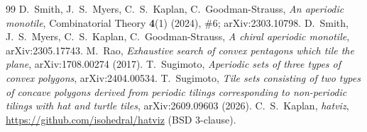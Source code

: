 \documentclass[11pt]{article}
\theoremstyle{remark}
\begin{document}
\begin{thebibliography}{99}
 D.~Smith, J.~S.~Myers, C.~S.~Kaplan, C.~Goodman-Strauss, \emph{An aperiodic monotile}, Combinatorial Theory \textbf{4}(1) (2024), \#6; arXiv:2303.10798.
 D.~Smith, J.~S.~Myers, C.~S.~Kaplan, C.~Goodman-Strauss, \emph{A chiral aperiodic monotile}, arXiv:2305.17743.
 M.~Rao, \emph{Exhaustive search of convex pentagons which tile the plane}, arXiv:1708.00274 (2017).
 T.~Sugimoto, \emph{Aperiodic sets of three types of convex polygons}, arXiv:2404.00534.
 T.~Sugimoto, \emph{Tile sets consisting of two types of concave polygons derived from periodic tilings corresponding to non-periodic tilings with hat and turtle tiles}, arXiv:2609.09603 (2026).
 C.~S.~Kaplan, \emph{hatviz}, \url{https://github.com/isohedral/hatviz} (BSD 3-clause).
\end{thebibliography}
\end{document}
